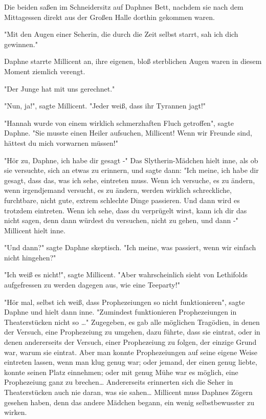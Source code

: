 {Die beiden saßen im Schneidersitz auf Daphnes Bett, nachdem sie nach dem Mittagessen direkt aus der Großen Halle dorthin gekommen waren.

"Mit den Augen einer Seherin, die durch die Zeit selbst starrt, sah ich dich gewinnen."

Daphne starrte Millicent an, ihre eigenen, bloß sterblichen Augen waren in diesem Moment ziemlich verengt.

"Der Junge hat mit uns gerechnet."

"Nun, ja!", sagte Millicent. "Jeder weiß, dass ihr Tyrannen jagt!"

"Hannah wurde von einem wirklich schmerzhaften Fluch getroffen", sagte Daphne. "Sie musste einen Heiler aufsuchen, Millicent! Wenn wir Freunde sind, hättest du mich vorwarnen müssen!"

"Hör zu, Daphne, ich habe dir gesagt -" Das Slytherin-Mädchen hielt inne, als ob sie versuchte, sich an etwas zu erinnern, und sagte dann: "Ich meine, ich habe dir gesagt, dass das, was ich sehe, eintreten muss. Wenn ich versuche, es zu ändern, wenn irgendjemand versucht, es zu ändern, werden wirklich schreckliche, furchtbare, nicht gute, extrem schlechte Dinge passieren. Und dann wird es trotzdem eintreten. Wenn ich sehe, dass du verprügelt wirst, kann ich dir das nicht sagen, denn dann würdest du versuchen, nicht zu gehen, und dann -" Millicent hielt inne.

"Und dann?" sagte Daphne skeptisch. "Ich meine, was passiert, wenn wir einfach nicht hingehen?"

"Ich weiß es nicht!", sagte Millicent. "Aber wahrscheinlich sieht von Lethifolds aufgefressen zu werden dagegen aus, wie eine Teeparty!"

"Hör mal, selbst ich weiß, dass Prophezeiungen so nicht funktionieren", sagte Daphne und hielt dann inne. "Zumindest funktionieren Prophezeiungen in Theaterstücken nicht so …" Zugegeben, es gab alle möglichen Tragödien, in denen der Versuch, eine Prophezeiung zu umgehen, dazu führte, dass sie eintrat, oder in denen andererseits der Versuch, einer Prophezeiung zu folgen, der einzige Grund war, warum sie eintrat. Aber man konnte Prophezeiungen auf seine eigene Weise eintreten lassen, wenn man klug genug war; oder jemand, der einen genug liebte, konnte seinen Platz einnehmen; oder mit genug Mühe war es möglich, eine Prophezeiung ganz zu brechen… Andererseits erinnerten sich die Seher in Theaterstücken auch nie daran, was sie sahen… Millicent muss Daphnes Zögern gesehen haben, denn das andere Mädchen begann, ein wenig selbstbewusster zu wirken.

}
